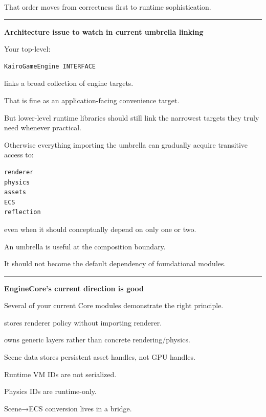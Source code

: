 That order moves from correctness first to runtime sophistication.

\begin{center}\rule{0.5\linewidth}{0.5pt}\end{center}

\textbf{Architecture issue to watch in current umbrella linking}

Your top-level:

\begin{verbatim}
KairoGameEngine INTERFACE
\end{verbatim}

links a broad collection of engine targets.

That is fine as an application-facing convenience target.

But lower-level runtime libraries should still link the narrowest targets they truly need whenever practical.

Otherwise everything importing the umbrella can gradually acquire transitive access to:

\begin{verbatim}
renderer
physics
assets
ECS
reflection
\end{verbatim}

even when it should conceptually depend on only one or two.

An umbrella is useful at the composition boundary.

It should not become the default dependency of foundational modules.

\begin{center}\rule{0.5\linewidth}{0.5pt}\end{center}

\textbf{EngineCore's current direction is good}

Several of your current Core modules demonstrate the right principle.

 stores renderer policy without importing renderer.

 owns generic layers rather than concrete rendering/physics.

Scene data stores persistent asset handles, not GPU handles.

Runtime VM IDs are not serialized.

Physics IDs are runtime-only.

Scene→ECS conversion lives in a bridge.

